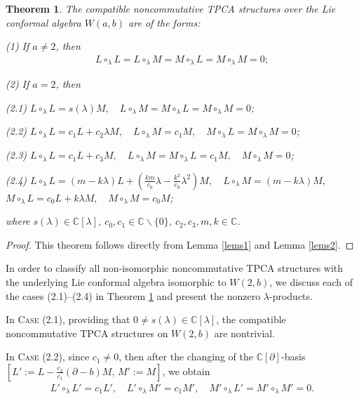 \documentclass[11pt,letterpaper,reqno]{amsart}
\newtheorem{theorem}{Theorem}[section]
\theoremstyle{definition}
\numberwithin{equation}{section}
\begin{document}
\begin{theorem}\label{theorem1}
The compatible noncommutative TPCA structures over the Lie conformal algebra $W(a,b)$ are of the forms:

(1) If $a\neq 2$, then
\begin{align*}
L\circ_\lambda L=L\circ_\lambda M=M\circ_\lambda L=M\circ_\lambda M=0;
\end{align*}

(2) If $a=2$, then

\indent\indent(2.1) $L\circ_\lambda L= s(\lambda)M,\quad L\circ_\lambda M=M\circ_\lambda L=M\circ_\lambda M=0$;  %

\indent\indent(2.2) $L\circ_\lambda L= c_1L+c_2\lambda M,\quad L\circ_\lambda M=c_1M, \quad M\circ_\lambda L=M\circ_\lambda M=0$; %

\indent\indent(2.3) $L\circ_\lambda L= c_1L+c_3M,\quad L\circ_\lambda M=M\circ_\lambda L=c_1M, \quad M\circ_\lambda M=0$;

\indent\indent(2.4) $L\circ_\lambda L= (m-k\lambda)L+(\frac{km}{c_0}\lambda-\frac{k^2}{c_0}\lambda^2)M,\quad L\circ_\lambda M=(m-k\lambda)M,$\\
\hphantom{\indent\indent(2.4)} $M\circ_\lambda L=c_0L+k\lambda M, \quad M\circ_\lambda M=c_0M$;

where $s(\lambda)\in \mathbb{C} [\lambda]$, $c_0,c_1\in \mathbb{C}\backslash\{0\}$, $c_2,c_3,m,k\in\mathbb{C}$.
\end{theorem}
\begin{proof}
This theorem follows directly from Lemma \ref{lems1} and Lemma \ref{lems2}.
\end{proof}

In order to classify all non-isomorphic noncommutative TPCA structures with the underlying Lie conformal algebra isomorphic to
$W(2,b)$, we discuss each of the cases {(2.1)--(2.4)} in Theorem \ref{theorem1} and present the nonzero $\lambda$-products.

In C\textsc{ase} (2.1), providing that $0 \neq s(\lambda)\in \mathbb{C} [\lambda]$, the compatible noncommutative TPCA structures on $W(2,b)$ are nontrivial.

In C\textsc{ase} (2.2), since $c_1\neq0$, then after the changing of the $\mathbb{C}[\partial]$-basis $[L':=L-\frac{c_2}{c_1}(\partial-b)M,\, M':= M]$, we obtain
\begin{align*}
L'\circ_\lambda L'=c_1L',\quad L'\circ_\lambda M'=c_1M',\quad M'\circ_\lambda L'=M'\circ_\lambda M'=0.
\end{align*}
\end{document}
